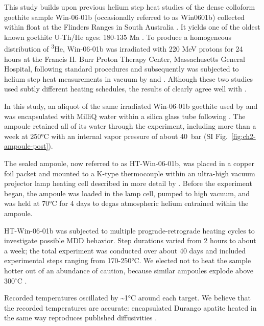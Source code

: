 This study builds upon previous helium step heat studies of the dense
colloform goethite sample Win-06-01b (occasionally referred to as
Win0601b) collected within float at the Flinders Ranges in South
Australia \citep{waltenberg2012,monteiro2017}. It yields one of the
oldest known goethite U-Th/He ages: 180-135 Ma \citep{waltenberg2012}.
To
produce a homogeneous distribution of \textsuperscript{3}He, Win-06-01b was irradiated
with 220 MeV protons for 24 hours at the Francis H. Burr Proton Therapy
Center, Massachusetts General Hospital, following standard procedures
\citep{shuster2004} and subsequently was subjected to helium step
heat measurements in vacuum by \citet{monteiro2017} and \citet{farley2024}.
Although these two studies used subtly different heating schedules,
the results of \citet{farley2024} clearly agree well with \citet{monteiro2017}.

In this study, an aliquot of the same irradiated Win-06-01b goethite
used by \citet{monteiro2017} and \citet{farley2024} was encapsulated with
MilliQ water within a silica glass tube following \citet{thyer2026method}. The ampoule retained all of its water through the experiment, including more than a week at
250°C with an internal vapor pressure of about 40~bar \citep{haar1984} (SI Fig.~\ref{fig:ch2-ampoule-post}).

The sealed ampoule, now referred to as HT-Win-06-01b, was placed in a
copper foil packet and mounted to a K-type thermocouple within an
ultra-high vacuum projector lamp heating cell described in more detail
by \citet{farley1999}. Before the experiment began, the ampoule was
loaded in the lamp cell, pumped to high vacuum, and was held at 70°C for
4 days to degas atmospheric helium entrained within the ampoule.

HT-Win-06-01b was subjected to multiple prograde-retrograde heating
cycles to investigate possible MDD behavior. Step durations varied from
2 hours to about a week; the total experiment was conducted over about
40 days and included experimental steps ranging from 170-250°C. We
elected not to heat the sample hotter out of an abundance of caution, because
similar ampoules explode above 300$^{\circ}$C \citep{thyer2026method}.

Recorded temperatures oscillated by \textasciitilde1°C around each target. We 
believe that the recorded temperatures are accurate: encapsulated Durango apatite 
heated in the same way reproduces published diffusivities \citep{thyer2026method}.

